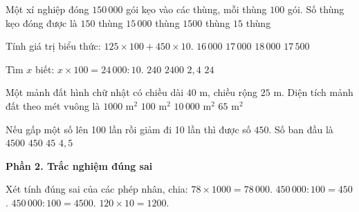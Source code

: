 \begin{ex} %
Một xí nghiệp đóng $150\,000$ gói kẹo vào các thùng, mỗi thùng $100$ gói. Số thùng kẹo đóng được là
\choice
{$150$ thùng}
{$15\,000$ thùng}
{\True $1500$ thùng}
{$15$ thùng}
\end{ex}

\begin{ex} %
Tính giá trị biểu thức: $125 \times 100 + 450 \times 10$.
\choice
{$16\,000$}
{\True $17\,000$}
{$18\,000$}
{$17\,500$}
\end{ex}

\begin{ex} %
Tìm $x$ biết: $x \times 100 = 24\,000 : 10$.
\choice
{$240$}
{$2400$}
{$2{,}4$}
{\True $24$}
\end{ex}

\begin{ex} %
Một mảnh đất hình chữ nhật có chiều dài $40\text{ m}$, chiều rộng $25\text{ m}$. Diện tích mảnh đất theo mét vuông là
\choice
{\True $1000\text{ m}^2$}
{$100\text{ m}^2$}
{$10\,000\text{ m}^2$}
{$65\text{ m}^2$}
\end{ex}

\begin{ex} %
Nếu gấp một số lên 100 lần rồi giảm đi 10 lần thì được số $450$. Số ban đầu là
\choice
{$4500$}
{$450$}
{\True $45$}
{$4{,}5$}
\end{ex}

\textbf{Phần 2. Trắc nghiệm đúng sai}

\begin{ex} %
Xét tính đúng sai của các phép nhân, chia:
\choiceTF
{\True $78 \times 1000 = 78\,000$.}
{$450\,000 : 100 = 450$.}
{\True $450\,000 : 100 = 4500$.}
{\True $120 \times 10 = 1200$.}
\end{ex}

